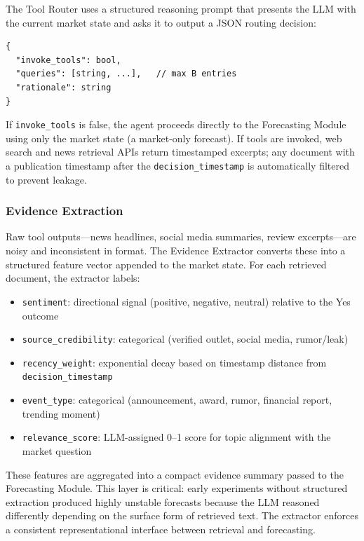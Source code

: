 \documentclass{article} %
\begin{document}
The Tool Router uses a structured reasoning prompt that presents the LLM with the current market state and asks it to output a JSON routing decision:

\begin{verbatim}
{
  "invoke_tools": bool,
  "queries": [string, ...],   // max B entries
  "rationale": string
}
\end{verbatim}

If \texttt{invoke\_tools} is false, the agent proceeds directly to the Forecasting Module using only the market state (a market-only forecast). If tools are invoked, web search and news retrieval APIs return timestamped excerpts; any document with a publication timestamp after the \texttt{decision\_timestamp} is automatically filtered to prevent leakage.

\subsubsection{Evidence Extraction}

Raw tool outputs—news headlines, social media summaries, review excerpts—are noisy and inconsistent in format. The Evidence Extractor converts these into a structured feature vector appended to the market state. For each retrieved document, the extractor labels:

\begin{itemize}[noitemsep]
    \item \texttt{sentiment}: directional signal (positive, negative, neutral) relative to the Yes outcome
    \item \texttt{source\_credibility}: categorical (verified outlet, social media, rumor/leak)
    \item \texttt{recency\_weight}: exponential decay based on timestamp distance from \texttt{decision\_timestamp}
    \item \texttt{event\_type}: categorical (announcement, award, rumor, financial report, trending moment)
    \item \texttt{relevance\_score}: LLM-assigned 0--1 score for topic alignment with the market question
\end{itemize}

These features are aggregated into a compact evidence summary passed to the Forecasting Module. This layer is critical: early experiments without structured extraction produced highly unstable forecasts because the LLM reasoned differently depending on the surface form of retrieved text. The extractor enforces a consistent representational interface between retrieval and forecasting.
\end{document}
